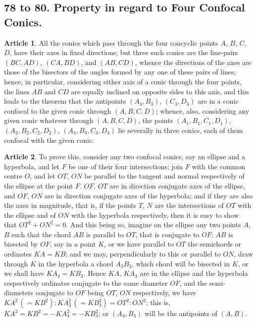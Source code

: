 \documentclass[11pt,a4paper]{article}
\theoremstyle{definition}
\newtheorem{art}{Article}
\begin{document}
\subsection{78 to 80. Property in regard to Four Confocal Conics.}

\begin{art}
All the conics which pass through the four concyclic points $A$, $B$, $C$, $D$, have their axes in fixed directions; but three such conics are the line-pairs $(BC, AD)$, $(CA, BD)$, and $(AB, CD)$, whence the directions of the axes are those of the bisectors of the angles formed by any one of these pairs of lines; hence, in particular, considering either axis of a conic through the four points, the lines $AB$ and $CD$ are equally inclined on opposite sides to this axis, and this leads to the theorem that the antipoints $(A_{3}, B_{3})$, $(C_{3}, D_{3})$ are in a conic confocal to the given conic through $(A, B, C, D)$; whence, also, considering any given conic whatever through $(A, B, C, D)$, the points $(A_{1}, B_{1}, C_{1}, D_{1})$, $(A_{2}, B_{2}, C_{2}, D_{2})$, $(A_{3}, B_{3}, C_{3}, D_{3})$ lie severally in three conics, each of them confocal with the given conic.
\end{art}

\begin{art}
To prove this, consider any two confocal conics, say an ellipse and a hyperbola, and let $F$ be one of their four intersections; join $F$ with the common centre $O$, and let $OT$, $ON$ be parallel to the tangent and normal respectively of the ellipse at the point $F$. $OF$, $OT$ are in direction conjugate axes of the ellipse, and $OF$, $ON$ are in direction conjugate axes of the hyperbola; and if they are also the axes in magnitude, that is, if the points $T$, $N$ are the intersections of $OT$ with the ellipse and of $ON$ with the hyperbola respectively, then it is easy to show that $OT^{2} + ON^{2} = 0$. And this being so, imagine on the ellipse any two points $A$, $B$ such that the chord $AB$ is parallel to $OT$, that is conjugate to $OF$; $AB$ is bisected by $OF$, say in a point $K$, or we have parallel to $OT$ the semichords or ordinates $KA = KB$; and we may, perpendicularly to this or parallel to $ON$, draw through $K$ in the hyperbola a chord $A_{3}B_{3}$, which chord will be bisected in $K$, or we shall have $KA_{3} = KB_{3}$. Hence $KA$, $KA_{3}$ are in the ellipse and the hyperbola respectively ordinates conjugate to the same diameter $OF$, and the semi-diameters conjugate to $OF$ being $OT$, $ON$ respectively, we have $KA^{2}\, (= KB^{2}) : KA_{3}^{2}\, (= KB_{3}^{2}) = OT^{2} : ON^{2}$; this is, $KA^{2} = KB^{2} = -KA_{3}^{2} = -KB_{3}^{2}$; or $(A_{3}, B_{3})$ will be the antipoints of $(A, B)$.
\end{art}
\end{document}
